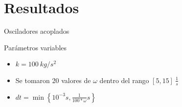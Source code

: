 \section{Resultados}\label{sec:resultados}

\begin{frame}{Osciladores acoplados}
    \begin{minipage}{0.45\textwidth}
        \begin{block}{Parámetros variables}
            \begin{itemize}
                \item $k = 100\ kg/s^2$
                \item Se tomaron 20 valores de $\omega$ dentro del rango $[5, 15]\ \frac{1}{s}$
                \item $dt = \min\left\{10^{-3}s, \frac{1}{100*\omega}s\right\}$
            \end{itemize}
        \end{block}
    \end{minipage}
    \hfill
    \begin{minipage}{0.45\textwidth}
    \end{minipage}
\end{frame}

